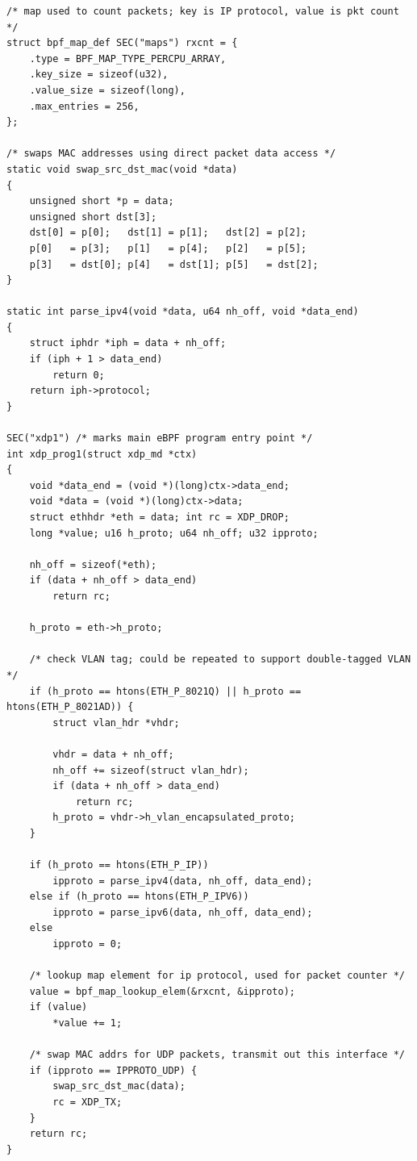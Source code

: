 \documentclass[sigconf]{acmart}
\begin{document}
\begin{listing}[p]
  \caption{\label{lst:ex-xdp-prog}Example XDP program. The program parses packet
    headers, swaps source and destination MAC addresses for all UDP packets, and
    sends them back out the same interface. A packet counter is kept per IP
    protocol number. Adapted from xdp2\_kern.c, which is distributed with the
    kernel source code.}
\begin{verbatim}
/* map used to count packets; key is IP protocol, value is pkt count */
struct bpf_map_def SEC("maps") rxcnt = {
	.type = BPF_MAP_TYPE_PERCPU_ARRAY,
	.key_size = sizeof(u32),
	.value_size = sizeof(long),
	.max_entries = 256,
};

/* swaps MAC addresses using direct packet data access */
static void swap_src_dst_mac(void *data)
{
	unsigned short *p = data;
	unsigned short dst[3];
	dst[0] = p[0];   dst[1] = p[1];   dst[2] = p[2];
	p[0]   = p[3];   p[1]   = p[4];   p[2]   = p[5];
	p[3]   = dst[0]; p[4]   = dst[1]; p[5]   = dst[2];
}

static int parse_ipv4(void *data, u64 nh_off, void *data_end)
{
	struct iphdr *iph = data + nh_off;
	if (iph + 1 > data_end)
		return 0;
	return iph->protocol;
}

SEC("xdp1") /* marks main eBPF program entry point */
int xdp_prog1(struct xdp_md *ctx)
{
	void *data_end = (void *)(long)ctx->data_end;
	void *data = (void *)(long)ctx->data;
	struct ethhdr *eth = data; int rc = XDP_DROP;
	long *value; u16 h_proto; u64 nh_off; u32 ipproto;

	nh_off = sizeof(*eth);
	if (data + nh_off > data_end)
		return rc;

	h_proto = eth->h_proto;

	/* check VLAN tag; could be repeated to support double-tagged VLAN */
	if (h_proto == htons(ETH_P_8021Q) || h_proto == htons(ETH_P_8021AD)) {
		struct vlan_hdr *vhdr;

		vhdr = data + nh_off;
		nh_off += sizeof(struct vlan_hdr);
		if (data + nh_off > data_end)
			return rc;
		h_proto = vhdr->h_vlan_encapsulated_proto;
	}

	if (h_proto == htons(ETH_P_IP))
		ipproto = parse_ipv4(data, nh_off, data_end);
	else if (h_proto == htons(ETH_P_IPV6))
		ipproto = parse_ipv6(data, nh_off, data_end);
	else
		ipproto = 0;

	/* lookup map element for ip protocol, used for packet counter */
	value = bpf_map_lookup_elem(&rxcnt, &ipproto);
	if (value)
		*value += 1;

	/* swap MAC addrs for UDP packets, transmit out this interface */
	if (ipproto == IPPROTO_UDP) {
		swap_src_dst_mac(data);
		rc = XDP_TX;
	}
	return rc;
}

\end{verbatim}
\end{listing}
\end{document}
